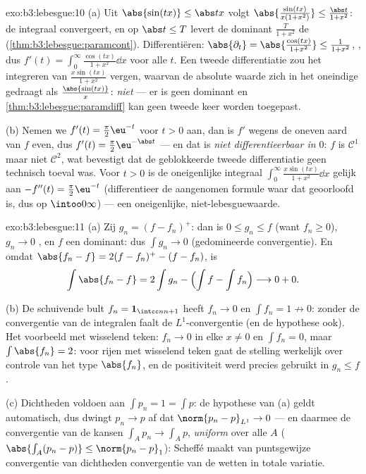 \begin{solution}{exo:b3:lebesgue:10}
(a) Uit $\abs{\sin(tx)} \leq \abs tx$ volgt
$\abs{\frac{\sin(tx)}{x(1+x^2)}} \leq \frac{\abs t}{1+x^2}$: de
integraal convergeert, en op $\abs t \leq T$ levert de dominant
$\frac{T}{1+x^2}$ de 
(\cref{thm:b3:lebesgue:paramcont}). Differentiëren:
$\abs{\partial_t} = \abs{\frac{\cos(tx)}{1+x^2}} \leq
\frac1{1+x^2}$, , dus $f'(t) =
\int_0^\infty\frac{\cos(tx)}{1+x^2}\dd x$ voor alle $t$. Een
tweede differentiatie zou het integreren van
$\frac{x\sin(tx)}{1 + x^2}$ vergen, waarvan de absolute waarde
zich in het oneindige gedraagt als $\frac{\abs{\sin(tx)}}x$:
\emph{niet}  --- er is geen dominant en
\cref{thm:b3:lebesgue:paramdiff} kan geen tweede keer worden
toegepast.

(b) Nemen we $f'(t) = \frac\pi2\eu^{-t}$ voor $t > 0$ aan, dan is
$f'$ wegens de oneven aard van $f$ even, dus $f'(t) =
\frac\pi2\eu^{-\abs t}$ --- en dat is \emph{niet differentieerbaar
in $0$}: $f$ is $\mathcal C^1$ maar niet $\mathcal C^2$, wat
bevestigt dat de geblokkeerde tweede differentiatie geen technisch
toeval was. Voor $t > 0$ is de oneigenlijke integraal
$\int_0^\infty\frac{x\sin(tx)}{1+x^2}\dd x$ gelijk aan $-f''(t) =
\frac\pi2\eu^{-t}$ (differentieer de aangenomen formule waar dat
geoorloofd is, dus op $\intoo0\infty$) --- een oneigenlijke,
niet-lebesguewaarde.
\end{solution}

\begin{solution}{exo:b3:lebesgue:11}
(a) Zij $g_n = (f - f_n)^+$: dan is $0 \leq g_n \leq f$ (want
$f_n \geq 0$), $g_n \to 0$ , en $f$ een 
dominant: dus $\int g_n \to 0$ (gedomineerde convergentie). En
omdat $\abs{f_n - f} = 2(f - f_n)^+ - (f - f_n)$, is
\[
\int\abs{f_n - f} = 2\int g_n - \Bigl(\int f - \int
f_n\Bigr) \longrightarrow 0 + 0 .
\]

(b) De schuivende bult $f_n = \mathbf 1_{\intcc n{n+1}}$ heeft
$f_n \to 0$  en $\int f_n = 1 \not\to 0$: zonder de
convergentie van de integralen faalt de $L^1$-convergentie (en de
hypothese ook). Het voorbeeld met wisselend teken: $f_n \to 0$ in
elke $x \neq 0$ en $\int f_n = 0$, maar $\int\abs{f_n} = 2$: voor
rijen met wisselend teken gaat de stelling werkelijk over controle
van het type $\abs{f_n}$, en de positiviteit werd precies gebruikt
in $g_n \leq f$.

(c) Dichtheden voldoen aan $\int p_n = 1 = \int p$: de hypothese
van (a) geldt automatisch, dus dwingt $p_n \to p$  af
dat $\norm{p_n - p}_{L^1} \to 0$ --- en daarmee de convergentie
van de kansen $\int_Ap_n \to \int_Ap$, \emph{uniform} over alle
 $A$ ($\abs{\int_A(p_n - p)} \leq \norm{p_n - p}_1$):
Scheffé maakt van puntsgewijze convergentie van dichtheden
convergentie van de wetten in totale variatie.
\end{solution}

